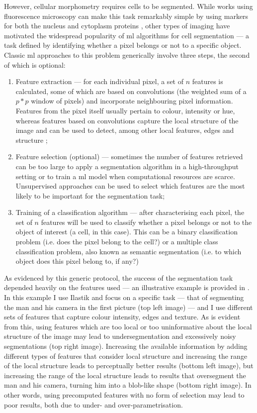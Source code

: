 However, cellular morphometry requires cells to be segmented. While works using fluorescence microscopy can make this task remarkably simple by using markers for both the nucleus and cytoplasm proteins \cite{Fuchs2010-pk,Gustafsdottir2013-ul}, other types of imaging have motivated the widespread popularity of \ac{ml} algorithms for cell segmentation --- a task defined by identifying whether a pixel belongs or not to a specific object. Classic \ac{ml} approaches to this problem generically involve three steps, the second of which is optional:

\begin{enumerate}
	\item Feature extraction --- for each individual pixel, a set of $n$ features is calculated, some of which are based on convolutions (the weighted sum of a $p*p$ window of pixels) and incorporate neighbouring pixel information. Features from the pixel itself usually pertain to colour, intensity or hue, whereas features based on convolutions capture the local structure of the image and can be used to detect, among other local features, edges \cite{Canny1986-pi} and structure \cite{Sato1998-sy};
	\item Feature selection (optional) --- sometimes the number of features retrieved can be too large to apply a segmentation algorithm in a high-throughput setting or to train a \ac{ml} model when computational resources are scarce. Unsupervised approaches can be used to select which features are the most likely to be important for the segmentation task;
	\item Training of a classification algorithm --- after characterising each pixel, the set of $n$ features will be used to classify whether a pixel belongs or not to the object of interest (a cell, in this case). This can be a binary classification problem (i.e. does the pixel belong to the cell?) or a multiple class classification problem, also known as semantic segmentation (i.e. to which object does this pixel belong to, if any?)
\end{enumerate}

As evidenced by this generic protocol, the success of the segmentation task depended heavily on the features used ---  an illustrative example is provided in . In this example I use Ilastik \cite{Sommer2011-ds} and focus on a specific task --- that of segmenting the man and his camera in the first picture (top left image) --- and I use different sets of features that capture colour intensity, edges and texture. As is evident from this, using features which are too local or too uninformative about the local structure of the image may lead to undersegmentation and excessively noisy segmentations (top right image). Increasing the available information by adding different types of features that consider local structure and increasing the range of the local structure leads to perceptually better results (bottom left image), but increasing the range of the local structure leads to results that oversegment the man and his camera, turning him into a blob-like shape (bottom right image). In other words, using precomputed features with no form of selection may lead to poor results, both due to under- and over-parametrisation. 

